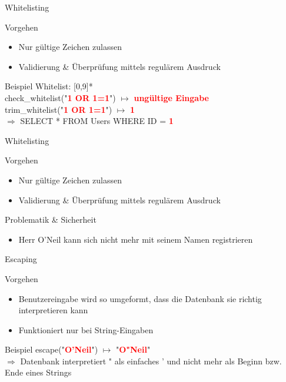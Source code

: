\begin{frame}{Whitelisting}
\begin{block}{Vorgehen}
\begin{itemize}[<+->]
	\item Nur gültige Zeichen zulassen
	\item Validierung \& Überprüfung mittels regulärem Ausdruck
\end{itemize}	
\end{block}
\begin{block}{Beispiel}	
	Whitelist: [0,9]* \\
	check\_whitelist("{}\textcolor{red}{\textbf{1 OR 1=1}}{}") $\mapsto$ \textcolor{red}{\textbf{ungültige Eingabe}} \\
	trim\_whitelist("{}\textcolor{red}{\textbf{1 OR 1=1}}{}") $\mapsto$ \textcolor{red}{\textbf{1}} \\
	$\Rightarrow$ SELECT * FROM Users WHERE ID = \textcolor{red}{\textbf{1}}
\end{block}
\end{frame}

\begin{frame}{Whitelisting}
\begin{block}{Vorgehen}
\begin{itemize}
	\item Nur gültige Zeichen zulassen
	\item Validierung \& Überprüfung mittels regulärem Ausdruck
\end{itemize}	
\end{block}
\begin{block}{Problematik \& Sicherheit}	
\begin{itemize}[<+->]
\item Herr O'Neil kann sich nicht mehr mit seinem Namen registrieren
\end{itemize}
\end{block}
\end{frame}


\begin{frame}{Escaping}
\begin{block}{Vorgehen}
\begin{itemize}[<+->]
\item Benutzereingabe wird so umgeformt, dass die Datenbank sie richtig interpretieren kann
\item Funktioniert nur bei String-Eingaben
\end{itemize}
\end{block}
\begin{block}{Beispiel}
	escape("{}\textcolor{red}{\textbf{O'Neil}}"{}) $\mapsto$ "{}\textcolor{red}{\textbf{O"{}Neil}}"{} \\
	$\Rightarrow$ Datenbank interpretiert "{} als einfaches ' und nicht mehr als Beginn bzw. Ende eines Strings
\end{block}
\end{frame}

